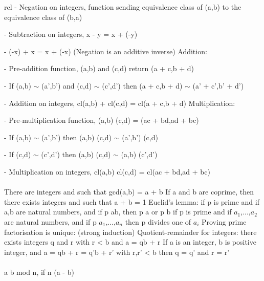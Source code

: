 \documentclass{article}
\begin{document}
\begin{arrary}{rcl}
- Negation on integers, function sending equivalence class of \math (a,b)\) to the equivalence class of \math (b,a)\)

- Subtraction on integers, \math x - y = x + (-y)\)

- \math (-x) + x = x + (-x)\) (Negation is an additive inverse)
\newline Addition:

- Pre-addition function, \math (a,b)\) and \math (c,d)\) return \math (a + c,b + d)\)

- If \math (a,b) $\sim$ (a',b')\) and \math (c,d) $\sim$ (c',d')\) then \math (a + c,b + d) $\sim$ (a' + c',b' + d')\)

- Addition on integers, \math cl(a,b) + cl(c,d) = cl(a + c,b + d)\)
\newline Multiplication:

- Pre-multiplication function, \math (a,b) \times (c,d) = (ac + bd,ad + bc)\)

- If \math (a,b) $\sim$ (a',b')\) then \math (a,b) \times (c,d) $\sim$ (a',b') \times (c,d)\)

- If \math (c,d) $\sim$ (c',d')\) then \math (a,b) \times (c,d) $\sim$ (a,b) \times (c',d')\)

- Multiplication on integers, \math cl(a,b) \times cl(c,d) = cl(ac + bd,ad + bc)\)
\\
\\
There are integers \lambda\) and \mu\) such that \math gcd(a,b) = \lambda a + \mu b\)
\newline If a and b are coprime, then there exists integers \lambda\) and \mu\) such that \lambda a + \mu b = 1\)
\newline Euclid's lemma: if p is prime and if a,b are natural numbers, and if p \vert\) ab, then p \vert\) a or p \vert\) b
\newline if p is prime and if $a_1$,...,$a_2$ are natural numbers, and if p \vert\) $a_1$,...,$a_n$ then p divides one of $a_i$
\newline Proving prime factorisation is unique: (strong induction)
\newline Quotient-remainder for integers: there exists integers q and r with  \leq r < b\) and \math a = qb + r\)
\newline If a is an integer, b is positive integer, and \math a = qb + r = q'b + r'\) with  \leq r\),\math r' < b\) then \math q = q'\) and \math r = r'\)
\\
\\
a \equiv\) b mod n, if n \vert (a - b)\)


\end{arrary}
\end{document}
